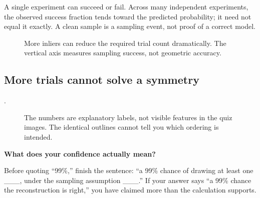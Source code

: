 \documentclass[letterpaper,11pt,english,openany,oneside]{jupyterBook}
\begin{document}
\sphinxAtStartPar
A single experiment can succeed or fail. Across many independent experiments, the observed success fraction tends toward the predicted probability; it need not equal it exactly. A clean sample is a sampling event, not proof of a correct model.

\begin{figure}[H]
\centering
\capstart

\noindent{}
\caption{More inliers can reduce the required trial count dramatically. The vertical axis measures sampling success, not geometric accuracy.}\label{\detokenize{lectures/lecture03/probability-ransac:fig-lec03-probability}}\end{figure}

\par\medskip


\subsection{More trials cannot solve a symmetry}
\label{\detokenize{lectures/lecture03/probability-ransac:more-trials-cannot-solve-a-symmetry}}
\ignorespaces
\sphinxAtStartPar
{} {\hyperref[\detokenize{lectures/lecture03/quiz-workbook:quiz-7-q1}]{}}.

\begin{figure}[H]
\centering
\capstart

\noindent{}
\caption{The numbers are explanatory labels, not visible features in the quiz images. The identical outlines cannot tell you which ordering is intended.}\label{\detokenize{lectures/lecture03/probability-ransac:fig-lec03-pentagon}}\end{figure}

\begin{TextbookBox}
\textbf{What does your confidence actually mean?}\par\smallskip

\sphinxAtStartPar
Before quoting “99\%,” finish the sentence: “a 99\% chance of drawing at least one \_\_\_, under the sampling assumption \_\_\_.” If your answer says “a 99\% chance the reconstruction is right,” you have claimed more than the calculation supports.

\end{TextbookBox}
\end{document}
